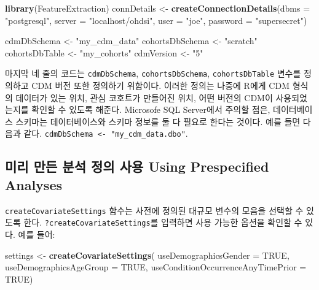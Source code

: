 \documentclass[10.5pt]{book}
\newenvironment{Shaded}{\begin{snugshade}}{\end{snugshade}}
\newcommand{\KeywordTok}[1]{\textcolor[rgb]{0.13,0.29,0.53}{\textbf{#1}}}
\newcommand{\DataTypeTok}[1]{\textcolor[rgb]{0.13,0.29,0.53}{#1}}
\newcommand{\StringTok}[1]{\textcolor[rgb]{0.31,0.60,0.02}{#1}}
\newcommand{\OtherTok}[1]{\textcolor[rgb]{0.56,0.35,0.01}{#1}}
\newcommand{\NormalTok}[1]{#1}
\theoremstyle{definition}
\theoremstyle{definition}
\theoremstyle{definition}
\theoremstyle{remark}
\begin{document}
\begin{Shaded}
\begin{Highlighting}[]
\KeywordTok{library}\NormalTok{(FeatureExtraction)}
\NormalTok{connDetails <-}\StringTok{ }\KeywordTok{createConnectionDetails}\NormalTok{(}\DataTypeTok{dbms =} \StringTok{"postgresql"}\NormalTok{,}
                                       \DataTypeTok{server =} \StringTok{"localhost/ohdsi"}\NormalTok{,}
                                       \DataTypeTok{user =} \StringTok{"joe"}\NormalTok{,}
                                       \DataTypeTok{password =} \StringTok{"supersecret"}\NormalTok{)}

\NormalTok{cdmDbSchema <-}\StringTok{ "my_cdm_data"}
\NormalTok{cohortsDbSchema <-}\StringTok{ "scratch"}
\NormalTok{cohortsDbTable <-}\StringTok{ "my_cohorts"}
\NormalTok{cdmVersion <-}\StringTok{ "5"}
\end{Highlighting}
\end{Shaded}

마지막 네 줄의 코드는 \texttt{cdmDbSchema}, \texttt{cohortsDbSchema},
\texttt{cohortsDbTable} 변수를 정의하고 CDM 버전 또한 정의하기 위함이다.
이러한 정의는 나중에 R에게 CDM 형식의 데이터가 있는 위치, 관심 코호트가
만들어진 위치, 어떤 버전의 CDM이 사용되었는지를 확인할 수 있도록 해준다.
Microsofe SQL Server에서 주의할 점은, 데이터베이스 스키마는
데이터베이스와 스키마 정보를 둘 다 필요로 한다는 것이다. 예를 들면
다음과 같다. \texttt{cdmDbSchema\ \textless{}-\ "my\_cdm\_data.dbo"}.

\subsection{미리 만든 분석 정의 사용 Using Prespecified
Analyses}\label{-----using-prespecified-analyses}

\texttt{createCovariateSettings} 함수는 사전에 정의된 대규모 변수의
모음을 선택할 수 있도록 한다. \texttt{?createCovariateSettings}를
입력하면 사용 가능한 옵션을 확인할 수 있다. 예를 들어:

\begin{Shaded}
\begin{Highlighting}[]
\NormalTok{settings <-}\StringTok{ }\KeywordTok{createCovariateSettings}\NormalTok{(}
  \DataTypeTok{useDemographicsGender =} \OtherTok{TRUE}\NormalTok{,}
  \DataTypeTok{useDemographicsAgeGroup =} \OtherTok{TRUE}\NormalTok{,}
  \DataTypeTok{useConditionOccurrenceAnyTimePrior =} \OtherTok{TRUE}\NormalTok{)}
\end{Highlighting}
\end{Shaded}
\end{document}
